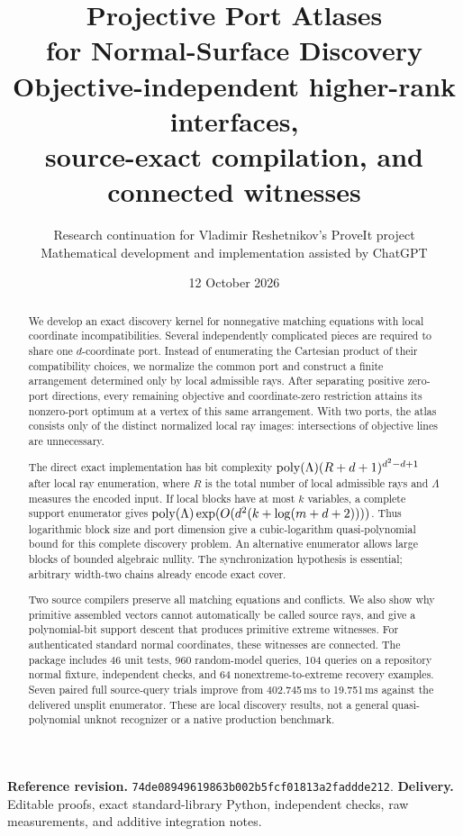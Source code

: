 \documentclass[11pt,a4paper]{article}
\title{\textbf{Projective Port Atlases\\for Normal-Surface Discovery}\\[7pt]
\large Objective-independent higher-rank interfaces,\\source-exact compilation, and connected witnesses}
\author{Research continuation for Vladimir Reshetnikov's ProveIt project\\
\small Mathematical development and implementation assisted by ChatGPT}
\date{12 October 2026}
\theoremstyle{definition}
\theoremstyle{remark}
\newcommand{\pin}{\texttt{74de08949619863b002b5fcf01813a2faddde212}}
\newcommand{\NormalBase}{402.745}
\newcommand{\NormalSplit}{19.751}
\begin{document}
\maketitle
\begin{abstract}
We develop an exact discovery kernel for nonnegative matching equations with local coordinate incompatibilities. Several independently complicated pieces are required to share one $d$-coordinate port. Instead of enumerating the Cartesian product of their compatibility choices, we normalize the common port and construct a finite arrangement determined only by local admissible rays. After separating positive zero-port directions, every remaining objective and coordinate-zero restriction attains its nonzero-port optimum at a vertex of this same arrangement. With two ports, the atlas consists only of the distinct normalized local ray images: intersections of objective lines are unnecessary.

The direct exact implementation has bit complexity $\operatorname{poly}(\Lambda)(R+d+1)^{d^2-d+1}$ after local ray enumeration, where $R$ is the total number of local admissible rays and $\Lambda$ measures the encoded input. If local blocks have at most $k$ variables, a complete support enumerator gives $\operatorname{poly}(\Lambda)\exp(O(d^2(k+\log(m+d+2))))$. Thus logarithmic block size and port dimension give a cubic-logarithm quasi-polynomial bound for this complete discovery problem. An alternative enumerator allows large blocks of bounded algebraic nullity. The synchronization hypothesis is essential; arbitrary width-two chains already encode exact cover.

Two source compilers preserve all matching equations and conflicts. We also show why primitive assembled vectors cannot automatically be called source rays, and give a polynomial-bit support descent that produces primitive extreme witnesses. For authenticated standard normal coordinates, these witnesses are connected. The package includes 46 unit tests, 960 random-model queries, 104 queries on a repository normal fixture, independent checks, and 64 nonextreme-to-extreme recovery examples. Seven paired full source-query trials improve from \NormalBase\,ms to \NormalSplit\,ms against the delivered unsplit enumerator. These are local discovery results, not a general quasi-polynomial unknot recognizer or a native production benchmark.
\end{abstract}
\vspace{5pt}
\noindent\textbf{Reference revision.} \pin.\quad
\textbf{Delivery.} Editable proofs, exact standard-library Python, independent checks, raw measurements, and additive integration notes.
\clearpage
\begingroup\footnotesize\setlength{\parskip}{0pt}\tableofcontents\endgroup
\clearpage
\end{document}
